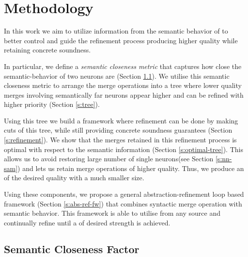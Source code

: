 \section{Methodology}
\label{s:semantic-closeness}

In this work we aim to utilize information from the semantic behavior of \cnc to
better control and guide the refinement process producing higher quality \abs
while retaining concrete soundness. 

In particular, we define a \textit{semantic
closeness metric} that captures how close the semantic-behavior of two 
neurons are (Section \ref{s:semantic-closeness}). We utilise this semantic
closeness metric to arrange the merge
operations into a tree where lower quality merges involving semantically far
neurons appear higher and can be refined with higher priority (Section
\ref{s:tree}). 

Using this tree we build a framework where refinement can
be done by making cuts of this tree, while still providing concrete soundness
guarantees (Section \ref{s:refinement}). We show that
the merges retained in this refinement process is optimal with respect to the
semantic information (Section \ref{s:optimal-tree}).
This allows us to avoid restoring large number of single neurons(see Section
\ref{s:nn-sam}) and lets us retain merge operations of higher quality. Thus, we
produce an \abs of the desired quality with a much smaller size. 



Using these components, we propose a general abstraction-refinement loop based
framework (Section \ref{s:abs-ref-fw}) that combines syntactic merge operation
with semantic behavior. This framework is able to utilise \gencex from any
source and continually refine until a \abs of desired strength is achieved.

\subsection{Semantic Closeness Factor}
\label{s:semantic-closeness}

